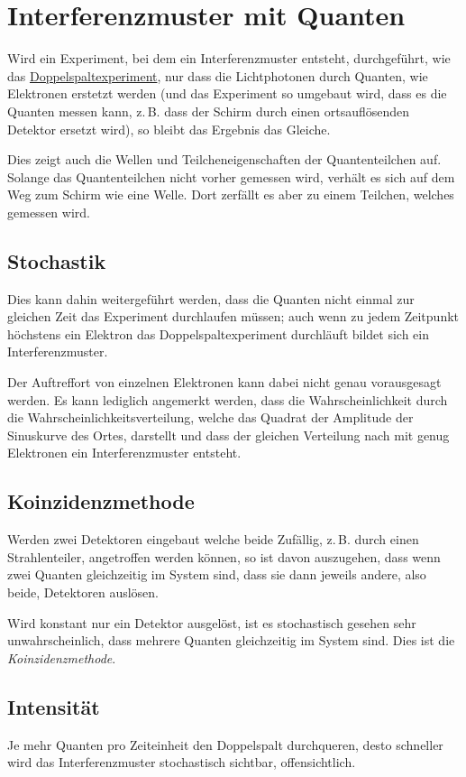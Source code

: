 \documentclass{article}
\begin{document}
\section{Interferenzmuster mit Quanten} 
Wird ein Experiment, bei dem ein Interferenzmuster entsteht, durchgeführt, wie das \hyperref[Das Doppelspaltexperiment]{Doppelspaltexperiment}, nur dass die Lichtphotonen durch Quanten, wie Elektronen erstetzt werden (und das Experiment so umgebaut wird, dass es die Quanten messen kann, z.\,B. dass der Schirm durch einen ortsauflösenden Detektor ersetzt wird), so bleibt das Ergebnis das Gleiche. 
 
Dies zeigt auch die Wellen und Teilcheneigenschaften der Quantenteilchen auf. Solange das Quantenteilchen nicht vorher gemessen wird, verhält es sich auf dem Weg zum Schirm wie eine Welle. Dort zerfällt es aber zu einem Teilchen, welches gemessen wird.  
 
\subsection{Stochastik}  
Dies kann dahin weitergeführt werden, dass die Quanten nicht einmal zur gleichen Zeit das Experiment durchlaufen müssen; auch wenn zu jedem Zeitpunkt höchstens ein Elektron das Doppelspaltexperiment durchläuft bildet sich ein Interferenzmuster.
 
Der Auftreffort von einzelnen Elektronen kann dabei nicht genau vorausgesagt werden. Es kann lediglich angemerkt werden, dass die Wahrscheinlichkeit durch die Wahrscheinlichkeitsverteilung, welche das Quadrat der Amplitude der Sinuskurve des Ortes, darstellt und dass der gleichen Verteilung nach mit genug Elektronen ein Interferenzmuster entsteht.
 
\subsection{Koinzidenzmethode}
Werden zwei Detektoren eingebaut welche beide Zufällig, z.\,B. durch einen Strahlenteiler, angetroffen werden können, so ist davon auszugehen, dass wenn zwei Quanten gleichzeitig im System sind, dass sie dann jeweils andere, also beide, Detektoren auslösen.
  
Wird konstant nur ein Detektor ausgelöst, ist es stochastisch gesehen sehr unwahrscheinlich, dass mehrere Quanten gleichzeitig im System sind. Dies ist die \emph{Koinzidenzmethode}.
 
\subsection{Intensität} 
Je mehr Quanten pro Zeiteinheit den Doppelspalt durchqueren, desto schneller wird das Interferenzmuster stochastisch sichtbar, offensichtlich.
\end{document}
